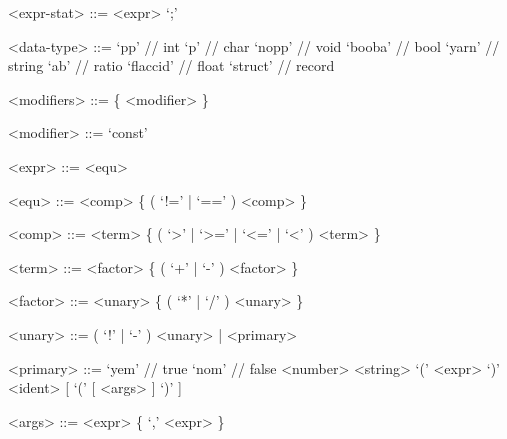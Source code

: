 \documentclass[12pt, a4paper]{article}
\begin{document}
\begin{grammar}
        <expr-stat> ::= <expr> `;'

        <data-type> ::= `pp' // int
        \alt `p' // char
        \alt `nopp' // void
        \alt `booba' // bool
        \alt `yarn' // string
        \alt `ab' // ratio
        \alt `flaccid' // float
        \alt `struct' // record

        <modifiers> ::= \{ <modifier> \}

        <modifier> ::= `const'

        <expr> ::= <equ>

        <equ> ::= <comp> \{ ( `!=' | `==' ) <comp> \}

        <comp> ::= <term> \{ ( `>' | `>=' | `<=' | `<' ) <term> \}

        <term> ::= <factor> \{ ( `+' | `-' ) <factor> \}

        <factor> ::= <unary> \{ ( `*' | `/' ) <unary> \}

        <unary> ::= ( `!' | `-' ) <unary> | <primary>

        <primary> ::= `yem' // true
        \alt `nom' // false
        \alt <number>
        \alt <string>
        \alt `(' <expr> `)'
        \alt <ident> [ `(' [ <args> ] `)' ]

        <args> ::= <expr> \{ `,' <expr> \}
    \end{grammar}
\end{document}
